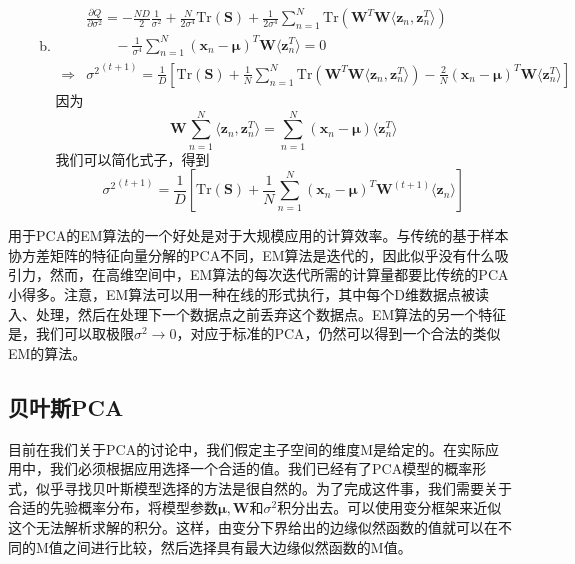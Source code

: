 \begin{enumerate}
\begin{enumerate}[(a)]
\begin{equation}
\begin{aligned}
			\end{aligned}
		\end{equation}
		\item 
		\begin{equation}
			\begin{aligned}
				&\frac{\partial Q}{\partial \sigma^2}=-\frac{ND}{2}\frac{1}{\sigma^2}+\frac{N}{2\sigma^4}\mathrm{Tr}(\boldsymbol{S})+\frac{1}{2\sigma^4}\sum_{n=1}^{N}\mathrm{Tr}(\boldsymbol{W}^T\boldsymbol{W}\langle \boldsymbol{z}_n,\boldsymbol{z}_n^T\rangle)\\
				&\qquad -\frac{1}{\sigma^4}\sum_{n=1}^{N}(\boldsymbol{x}_n-\boldsymbol{\mu})^T\boldsymbol{W}\langle \boldsymbol{z}_n^T\rangle=0\\
				\Rightarrow&{\sigma^2}^{(t+1)}=\frac{1}{D}\left[\mathrm{Tr}(\boldsymbol{S})+\frac{1}{N}\sum_{n=1}^{N}\mathrm{Tr}(\boldsymbol{W}^T\boldsymbol{W}\langle \boldsymbol{z}_n,\boldsymbol{z}_n^T\rangle)-\frac{2}{N}(\boldsymbol{x}_n-\boldsymbol{\mu})^T\boldsymbol{W}\langle \boldsymbol{z}_n^T\rangle \right]
			\end{aligned}
		\end{equation}
		因为
		\begin{equation}
			\boldsymbol{W}\sum_{n=1}^{N}\langle \boldsymbol{z}_n,\boldsymbol{z}_n^T\rangle =\sum_{n=1}^{N}(\boldsymbol{x}_n-\boldsymbol{\mu})\langle \boldsymbol{z}_n^T\rangle 
		\end{equation}
		我们可以简化式子，得到 
		\begin{equation}
			{\sigma^2}^{(t+1)}=\frac{1}{D}\left[\mathrm{Tr}(\boldsymbol{S})+\frac{1}{N}\sum_{n=1}^{N}(\boldsymbol{x}_n-\boldsymbol{\mu})^T\boldsymbol{W}^{(t+1)}\langle\boldsymbol{z}_n\rangle \right]
		\end{equation}
	\end{enumerate}
\end{enumerate}

用于PCA的EM算法的一个好处是对于大规模应用的计算效率。与传统的基于样本协方差矩阵的特征向量分解的PCA不同，EM算法是迭代的，因此似乎没有什么吸引力，然而，在高维空间中，EM算法的每次迭代所需的计算量都要比传统的PCA小得多。注意，EM算法可以用一种在线的形式执行，其中每个D维数据点被读入、处理，然后在处理下一个数据点之前丢弃这个数据点。EM算法的另一个特征是，我们可以取极限$\sigma^2\to 0$，对应于标准的PCA，仍然可以得到一个合法的类似EM的算法。

\subsection*{贝叶斯PCA}
目前在我们关于PCA的讨论中，我们假定主子空间的维度M是给定的。在实际应用中，我们必须根据应用选择一个合适的值。我们已经有了PCA模型的概率形式，似乎寻找贝叶斯模型选择的方法是很自然的。为了完成这件事，我们需要关于合适的先验概率分布，将模型参数$\boldsymbol{\mu},\boldsymbol{W}$和$\sigma^2$积分出去。可以使用变分框架来近似这个无法解析求解的积分。这样，由变分下界给出的边缘似然函数的值就可以在不同的M值之间进行比较，然后选择具有最大边缘似然函数的M值。

